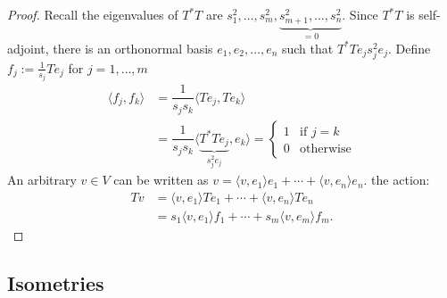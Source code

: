 \documentclass{article}
\begin{document}
\begin{proof}
	Recall the eigenvalues of $T^{*}T$ are $s_{1}^{2}, \ldots, s_{m}^{2},\underbrace{s_{m + 1}^{2}, \ldots, s_{n}^{2}}_{=0}$. Since $T^{*}T$ is self-adjoint, there is an orthonormal basis $e_{1}, e_{2}, \ldots, e_{n}$ such that $T^{*}Te_{j}s_{j}^{2}e_{j}$. Define $f_{j} := \frac{1}{s_{j}}Te_{j}$ for $j = 1, \ldots, m$
	\begin{align*}
		\langle f_{j},f_{k} \rangle &= \dfrac{1}{s_{j}s_{k}}\langle Te_{j}, Te_{k} \rangle \\
				   &= \dfrac{1}{s_{j}s_{k}}\langle \underbrace{T^{*}Te_{j}}_{s_{j}^{2}e_{j}}, e_{k} \rangle = 
				   \begin{cases}
					   1 & \text{if $j = k$} \\
					   0 & \text{otherwise}
				   \end{cases}
	\end{align*}
An arbitrary $v \in V$ can be written as $v = \langle v, e_{1} \rangle e_{1} + \cdots + \langle v, e_{n} \rangle e_{n}$. the action:
\begin{align*}
	Tv &= \langle v, e_{1} \rangle Te_{1} + \cdots + \langle v, e_{n} \rangle Te_{n} \\
	   &= s_{1}\langle v, e_{1} \rangle f_{1} + \cdots + s_{m}\langle v, e_{m} \rangle f_{m}.
\end{align*}
\end{proof}
\begin{topic}
	\section*{Isometries}
\end{topic}
\end{document}
